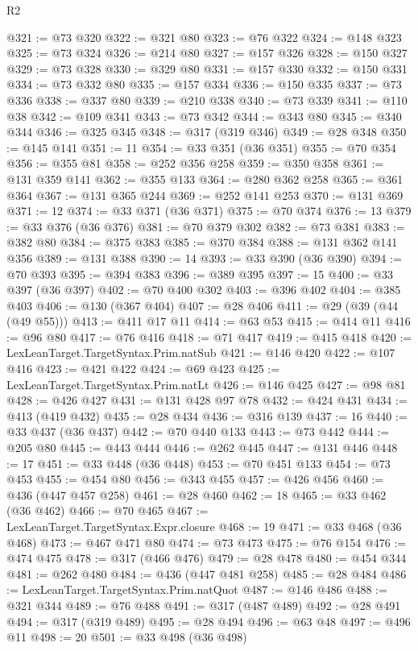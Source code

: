\begin{lexlean}{R2}
\begin{coremodule}
@321 := @73 @320
@322 := @321 @80
@323 := @76 @322
@324 := @148 @323
@325 := @73 @324
@326 := @214 @80
@327 := @157 @326
@328 := @150 @327
@329 := @73 @328
@330 := @329 @80
@331 := @157 @330
@332 := @150 @331
@334 := @73 @332 @80
@335 := @157 @334
@336 := @150 @335
@337 := @73 @336
@338 := @337 @80
@339 := @210 @338
@340 := @73 @339
@341 := @110 @38
@342 := @109 @341
@343 := @73 @342
@344 := @343 @80
@345 := @340 @344
@346 := @325 @345
@348 := @317 (@319 @346)
@349 := @28 @348
@350 := @145 @141
@351 := 11
@354 := @33 @351 (@36 @351)
@355 := @70 @354
@356 := @355 @81
@358 := @252 @356 @258
@359 := @350 @358
@361 := @131 @359 @141
@362 := @355 @133
@364 := @280 @362 @258
@365 := @361 @364
@367 := @131 @365 @244
@369 := @252 @141 @253
@370 := @131 @369
@371 := 12
@374 := @33 @371 (@36 @371)
@375 := @70 @374
@376 := 13
@379 := @33 @376 (@36 @376)
@381 := @70 @379 @302
@382 := @73 @381
@383 := @382 @80
@384 := @375 @383
@385 := @370 @384
@388 := @131 @362 @141 @356
@389 := @131 @388
@390 := 14
@393 := @33 @390 (@36 @390)
@394 := @70 @393
@395 := @394 @383
@396 := @389 @395
@397 := 15
@400 := @33 @397 (@36 @397)
@402 := @70 @400 @302
@403 := @396 @402
@404 := @385 @403
@406 := @130 (@367 @404)
@407 := @28 @406
@411 := @29 (@39 (@44 (@49 @55)))
@413 := @411 @17 @11
@414 := @63 @53
@415 := @414 @11
@416 := @96 @80
@417 := @76 @416
@418 := @71 @417
@419 := @415 @418
@420 := LexLeanTarget.TargetSyntax.Prim.natSub
@421 := @146 @420
@422 := @107 @416
@423 := @421 @422
@424 := @69 @423
@425 := LexLeanTarget.TargetSyntax.Prim.natLt
@426 := @146 @425
@427 := @98 @81
@428 := @426 @427
@431 := @131 @428 @97 @78
@432 := @424 @431
@434 := @413 (@419 @432)
@435 := @28 @434
@436 := @316 @139
@437 := 16
@440 := @33 @437 (@36 @437)
@442 := @70 @440 @133
@443 := @73 @442
@444 := @205 @80
@445 := @443 @444
@446 := @262 @445
@447 := @131 @446
@448 := 17
@451 := @33 @448 (@36 @448)
@453 := @70 @451 @133
@454 := @73 @453
@455 := @454 @80
@456 := @343 @455
@457 := @426 @456
@460 := @436 (@447 @457 @258)
@461 := @28 @460
@462 := 18
@465 := @33 @462 (@36 @462)
@466 := @70 @465
@467 := LexLeanTarget.TargetSyntax.Expr.closure
@468 := 19
@471 := @33 @468 (@36 @468)
@473 := @467 @471 @80
@474 := @73 @473
@475 := @76 @154
@476 := @474 @475
@478 := @317 (@466 @476)
@479 := @28 @478
@480 := @454 @344
@481 := @262 @480
@484 := @436 (@447 @481 @258)
@485 := @28 @484
@486 := LexLeanTarget.TargetSyntax.Prim.natQuot
@487 := @146 @486
@488 := @321 @344
@489 := @76 @488
@491 := @317 (@487 @489)
@492 := @28 @491
@494 := @317 (@319 @489)
@495 := @28 @494
@496 := @63 @48
@497 := @496 @11
@498 := 20
@501 := @33 @498 (@36 @498)

\end{coremodule}
\end{lexlean}
